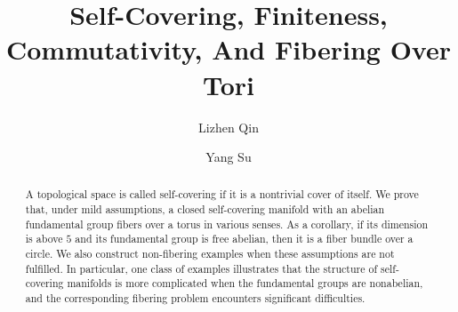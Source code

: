 \documentclass[12pt]{amsart}
\title[Self-Covering]{Self-Covering, Finiteness, Commutativity, And Fibering Over Tori}
\theoremstyle{plain}
\theoremstyle{definition}
\theoremstyle{question}
\theoremstyle{remark}
\theoremstyle{assumption}
\numberwithin{equation}{section}
\theoremstyle{bigthm}
\begin{document}
\author{Lizhen Qin}
\address{School of Mathematics, Nanjing University, 22 Hankou Road, Nanjing, Jiangsu 210093, China}

\author{Yang Su}
\address{HLM, Academy of Mathematics and Systems Science, Chinese Academy of Sciences, Beijing 100190, China}
\address{School of Mathematical Sciences, University of Chinese Academy of Sciences, Beijing 100049, China}


\maketitle



\begin{abstract}
A topological space is called self-covering if it is a nontrivial cover of itself. We prove that, under mild assumptions, a closed self-covering manifold with an abelian fundamental group fibers over a torus in various senses. As a corollary, if its dimension is above $5$ and its fundamental group is free abelian, then it is a fiber bundle over a circle. We also construct non-fibering examples when these assumptions are not fulfilled. In particular, one class of examples illustrates that the structure of self-covering manifolds is more complicated when the fundamental groups are nonabelian, and the corresponding fibering problem encounters significant difficulties.
\end{abstract}


\end{document}
